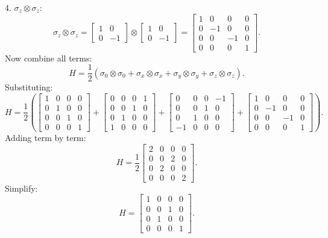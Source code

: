 \documentclass{article}
\begin{document}
4. \( \sigma_z \otimes \sigma_z \):
\[
\sigma_z \otimes \sigma_z =
\begin{bmatrix}
1 & 0 \\
0 & -1
\end{bmatrix} \otimes
\begin{bmatrix}
1 & 0 \\
0 & -1
\end{bmatrix} =
\begin{bmatrix}
1 & 0 & 0 & 0 \\
0 & -1 & 0 & 0 \\
0 & 0 & -1 & 0 \\
0 & 0 & 0 & 1
\end{bmatrix}.
\]
Now combine all terms:
\[
H = \frac{1}{2} \left( \sigma_0 \otimes \sigma_0 + \sigma_x \otimes \sigma_x + \sigma_y \otimes \sigma_y + \sigma_z \otimes \sigma_z \right).
\]
Substituting:
\[
H = \frac{1}{2} \left(
\begin{bmatrix}
1 & 0 & 0 & 0 \\
0 & 1 & 0 & 0 \\
0 & 0 & 1 & 0 \\
0 & 0 & 0 & 1
\end{bmatrix}
+
\begin{bmatrix}
0 & 0 & 0 & 1 \\
0 & 0 & 1 & 0 \\
0 & 1 & 0 & 0 \\
1 & 0 & 0 & 0
\end{bmatrix}
+
\begin{bmatrix}
0 & 0 & 0 & -1 \\
0 & 0 & 1 & 0 \\
0 & 1 & 0 & 0 \\
-1 & 0 & 0 & 0
\end{bmatrix}
+
\begin{bmatrix}
1 & 0 & 0 & 0 \\
0 & -1 & 0 & 0 \\
0 & 0 & -1 & 0 \\
0 & 0 & 0 & 1
\end{bmatrix}
\right).
\]
Adding term by term:
\[
H = \frac{1}{2} \begin{bmatrix}
2 & 0 & 0 & 0 \\
0 & 0 & 2 & 0 \\
0 & 2 & 0 & 0 \\
0 & 0 & 0 & 2
\end{bmatrix}.
\]
Simplify:
\[
H = \begin{bmatrix}
1 & 0 & 0 & 0 \\
0 & 0 & 1 & 0 \\
0 & 1 & 0 & 0 \\
0 & 0 & 0 & 1
\end{bmatrix}.
\]
\end{document}
